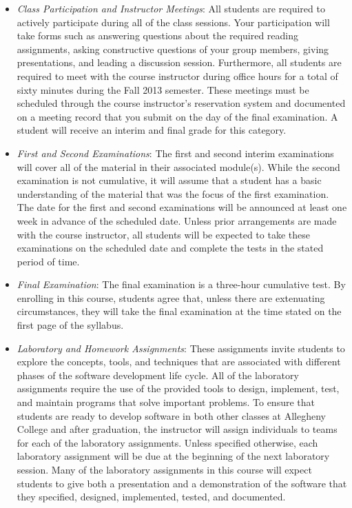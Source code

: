 \begin{itemize}

  \item {\em Class Participation and Instructor Meetings}: All students are required to actively participate during
    all of the class sessions. Your participation will take forms such as answering questions about the required
    reading assignments, asking constructive questions of your group members, giving presentations, and leading a
    discussion session. Furthermore, all students are required to meet with the course instructor during office
    hours for a total of sixty minutes during the Fall 2013 semester.  These meetings must be scheduled through the
    course instructor's reservation system and documented on a meeting record that you submit on the day of the final
    examination. A student will receive an interim and final grade for this category.

  \item {\em First and Second Examinations}: The first and second interim examinations will cover all of the material
    in their associated module(s).  While the second examination is not cumulative, it will assume that a student has a
    basic understanding of the material that was the focus of the first examination.  The date for the first and
    second examinations will be announced at least one week in advance of the scheduled date.  Unless prior
    arrangements are made with the course instructor, all students will be expected to take these examinations on the
    scheduled date and complete the tests in the stated period of time.

  \item {\em Final Examination}: The final examination is a three-hour cumulative test.  By enrolling in this course,
    students agree that, unless there are extenuating circumstances, they will take the final examination at the
    time stated on the first page of the syllabus.

  \item {\em Laboratory and Homework Assignments}: These assignments invite students to explore the concepts, tools,
    and techniques that are associated with different phases of the software development life cycle.  All of the
    laboratory assignments require the use of the provided tools to design, implement, test, and maintain programs
    that solve important problems.  To ensure that students are ready to develop software in both other classes at
    Allegheny College and after graduation, the instructor will assign individuals to teams for each of the
    laboratory assignments.  Unless specified otherwise, each laboratory assignment will be due at the beginning of
    the next laboratory session.  Many of the laboratory assignments in this course will expect students to
    give both a presentation and a demonstration of the software that they specified, designed, implemented, tested,
    and documented.  


\end{itemize}
